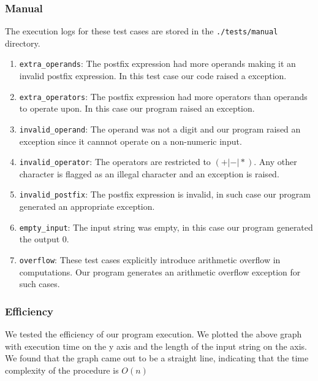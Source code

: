 \documentclass[hidelinks,12pt]{article}
\begin{document}
\subsubsection{Manual}
The execution logs for these test cases are stored in the \verb|./tests/manual| directory.
\begin{enumerate}
    \item \verb|extra_operands|: The postfix expression had more operands making it an invalid postfix expression. In this test case our code raised a exception.
    \item \verb|extra_operators|: The postfix expression had more operators than operands to operate upon. In this case our program raised an exception.
    \item \verb|invalid_operand|: The operand was not a digit and our program raised an exception since it cannnot operate on a non-numeric input.
    \item \verb|invalid_operator|: The operators are restricted to $(+|-|*)$. Any other character is flagged as an illegal character and an exception is raised.
    \item \verb|invalid_postfix|: The postfix expression is invalid, in such case our program generated an appropriate exception.
    \item \verb|empty_input|: The input string was empty, in this case our program generated the output $0$.
    \item \verb|overflow|: These test cases explicitly introduce arithmetic overflow in computations. Our program generates an arithmetic overflow exception for such cases.
\end{enumerate}

\subsubsection{Efficiency}
We tested the efficiency of our program execution. We plotted the above graph with execution time on the y axis and the length of the input string on the axis.
We found that the graph came out to be a straight line, indicating that the time complexity of the procedure is $O(n)$
\end{document}
